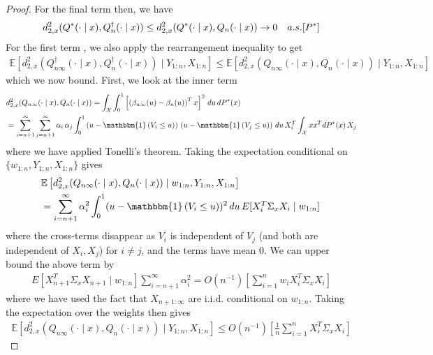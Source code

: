 \documentclass[11pt,a4paper]{article}
\newcommand{\E}{\mathbb{E}}
\begin{document}
\begin{appendices}
\begin{proof}
For the final term then, we have
\begin{align*}
 {d}^2_{2,x}(Q^*(\cdot \mid x), Q^{\dagger}_n(\cdot \mid x)) \leq  {d}^2_{2,x}(Q^*(\cdot \mid x), Q_n(\cdot \mid x)) \to 0 \quad \textnormal{a.s.}[P^*]
\end{align*}
For the first term , we also apply the rearrangement inequality to get
\begin{align*}
   \E\left[{d}^2_{2,x}(Q_{n\infty}^{\dagger}(\cdot \mid x), Q^{\dagger}_n(\cdot \mid x))\mid Y_{1:n}, X_{1:n}\right] \leq   \E\left[{d}^2_{2,x}(Q_{n\infty}(\cdot \mid x), Q_n(\cdot \mid x))\mid Y_{1:n}, X_{1:n}\right]
\end{align*}
which we now bound. First, we look at the inner term
\begin{align*}
    &{d}^2_{2,x}(Q_{n\infty}(\cdot \mid x), Q_n(\cdot \mid x)) = \int_{\mathcal{X}} \int_0^1 \left[\left(\beta_{n\infty}(u) - \beta_{n}(u)\right)^T x\right]^2 \, du \, dP^*(x)\\
    &=\sum_{i = n+1}^\infty \sum_{j = n+1}^\infty \alpha_i\, \alpha_j \int_0^1\left(u - \mathbbm{1}\left(V_i \leq u\right)\right)\, \left(u - \mathbbm{1}\left(V_j \leq u\right)\right) \, du\, X_i^T \int_{\mathcal{X}} x x^T dP^*(x)\,  X_j
\end{align*}
where we have applied Tonelli's theorem. Taking the expectation conditional on $\{w_{1:n}, Y_{1:n}, X_{1:n}\}$ gives
\begin{align*}
    &\E\left[{d}^2_{2,x}(Q_{n\infty}(\cdot \mid x), Q_n(\cdot \mid x))\mid w_{1:n}, Y_{1:n}, X_{1:n}\right]\\
    &=\sum_{i = n+1}^\infty \alpha_i^2 \int_0^1 (u - \mathbbm{1}\left(V_i  \leq u\right))^2\, du \, E[X_i^T   \Sigma_x X_i\mid w_{1:n}]\,
\end{align*}
where the cross-terms disappear as $V_i$ is independent of $V_j$ (and both are independent of $X_i,X_j$) for $i\neq j$, and the terms have mean 0.
We can upper bound the above term by
\begin{align*}
   E\left[X_{n+1}^T   \Sigma_x X_{n+1}\mid w_{1:n}\right] \sum_{i = n+1}^\infty \alpha_i^2  =O(n^{-1}) \left[\sum_{i = 1}^n w_i X_i^T \Sigma_x X_i\right]
\end{align*}
where we have used the fact that $X_{n+1:\infty}$ are i.i.d. conditional on $w_{1:n}$. Taking the expectation over the weights then gives
\begin{align*}
    \E\left[{d}^2_{2,x}(Q_{n\infty}(\cdot \mid x), Q_n(\cdot \mid x))\mid Y_{1:n}, X_{1:n}\right]\leq O(n^{-1}) \left[\frac{1}{n}\sum_{i= 1}^n X_i^T \Sigma_x X_i\right]

\end{align*}
\end{proof}
\end{appendices}
\end{document}
